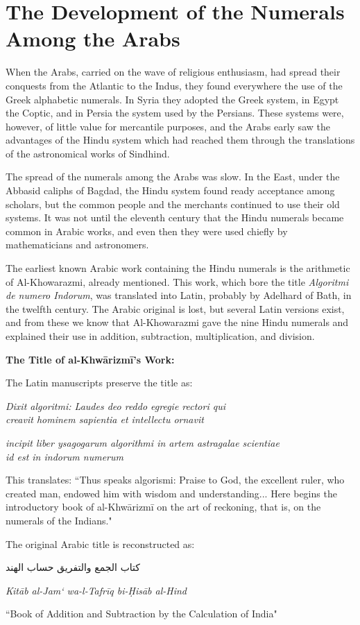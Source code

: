 \documentclass[11pt,a4paper]{article}
\newcommand{\ar}[1]{{\arabicfont #1}}
\newenvironment{arabicpassage}{%
  \begin{tcolorbox}[colback=arabicbg,colframe=rulecolor,boxrule=0.5pt,
    left=8pt,right=8pt,top=6pt,bottom=6pt,fontupper=\arabicfont\large]
}{\end{tcolorbox}}
\newenvironment{latinpassage}{%
  \begin{tcolorbox}[colback=latinbg,colframe=rulecolor,boxrule=0.5pt,
    left=8pt,right=8pt,top=6pt,bottom=6pt,fontupper=\itshape]
}{\end{tcolorbox}}
\newenvironment{enhancednote}{%
  \begin{tcolorbox}[colback=enhancedbg,colframe=notecolor,boxrule=1pt,
    left=10pt,right=10pt,top=8pt,bottom=8pt,
    title={\textbf{Enhanced Edition Note}},fonttitle=\bfseries\color{notecolor}]
}{\end{tcolorbox}}
\begin{document}
\newpage

\section{The Development of the Numerals Among the Arabs}

When the Arabs, carried on the wave of religious enthusiasm, had spread their conquests from the Atlantic to the Indus, they found everywhere the use of the Greek alphabetic numerals. In Syria they adopted the Greek system, in Egypt the Coptic, and in Persia the system used by the Persians. These systems were, however, of little value for mercantile purposes, and the Arabs early saw the advantages of the Hindu system which had reached them through the translations of the astronomical works of Sindhind.

The spread of the numerals among the Arabs was slow. In the East, under the Abbasid caliphs of Bagdad, the Hindu system found ready acceptance among scholars, but the common people and the merchants continued to use their old systems. It was not until the eleventh century that the Hindu numerals became common in Arabic works, and even then they were used chiefly by mathematicians and astronomers.

The earliest known Arabic work containing the Hindu numerals is the arithmetic of Al-Khowarazmi, already mentioned. This work, which bore the title \textit{Algoritmi de numero Indorum}, was translated into Latin, probably by Adelhard of Bath, in the twelfth century. The Arabic original is lost, but several Latin versions exist, and from these we know that Al-Khowarazmi gave the nine Hindu numerals and explained their use in addition, subtraction, multiplication, and division.

\begin{enhancednote}
\textbf{The Title of al-Khw\=arizm\=i's Work:}

The Latin manuscripts preserve the title as:
\begin{latinpassage}
\textit{Dixit algoritmi: Laudes deo reddo egregie rectori qui}\\
\textit{creavit hominem sapientia et intellectu ornavit}

\textit{incipit liber ysagogarum algorithmi in artem astragalae scientiae}\\
\textit{id est in indorum numerum}
\end{latinpassage}

This translates: ``Thus speaks algorismi: Praise to God, the excellent ruler, who created man, endowed him with wisdom and understanding... Here begins the introductory book of al-Khw\=arizm\=i on the art of reckoning, that is, on the numerals of the Indians."

The original Arabic title is reconstructed as:
\begin{arabicpassage}
\ar{كتاب الجمع والتفريق حساب الهند}

\textit{Kit\=ab al-Jam` wa-l-Tafr\=iq bi-\d{H}is\=ab al-Hind}

``Book of Addition and Subtraction by the Calculation of India"
\end{arabicpassage}
\end{enhancednote}
\end{document}
